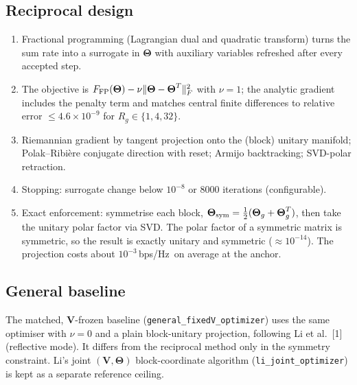 \documentclass[10pt,a4paper]{article}
\newcommand{\bpsHz}{bps/Hz}
\newcommand{\THT}{\boldsymbol{\Theta}}
\begin{document}
\subsection{Reciprocal design}
\begin{enumerate}
\item Fractional programming (Lagrangian dual and quadratic transform) turns the sum rate into a surrogate in $\THT$ with auxiliary variables refreshed after every accepted step.
\item The objective is $F_{\rm FP}(\THT)-\nu\|\THT-\THT^T\|_F^2$ with $\nu=1$; the analytic gradient includes the penalty term and matches central finite differences to relative error $\le4.6\times10^{-9}$ for $R_g\in\{1,4,32\}$.
\item Riemannian gradient by tangent projection onto the (block) unitary manifold; Polak--Ribi\`ere conjugate direction with reset; Armijo backtracking; SVD-polar retraction.
\item Stopping: surrogate change below $10^{-8}$ or 8000 iterations (configurable).
\item Exact enforcement: symmetrise each block, $\THT_{\rm sym}=\tfrac12(\THT_g+\THT_g^T)$, then take the unitary polar factor via SVD. The polar factor of a symmetric matrix is symmetric, so the result is exactly unitary and symmetric ($\approx10^{-14}$). The projection costs about $10^{-3}$\,\bpsHz\ on average at the anchor.
\end{enumerate}

\subsection{General baseline}
The matched, $\mathbf V$-frozen baseline (\texttt{general\_fixedV\_optimizer}) uses the same optimiser with $\nu=0$ and a plain block-unitary projection, following Li et al.~[1] (reflective mode). It differs from the reciprocal method only in the symmetry constraint. Li's joint $(\mathbf V,\THT)$ block-coordinate algorithm (\texttt{li\_joint\_optimizer}) is kept as a separate reference ceiling.
\end{document}
